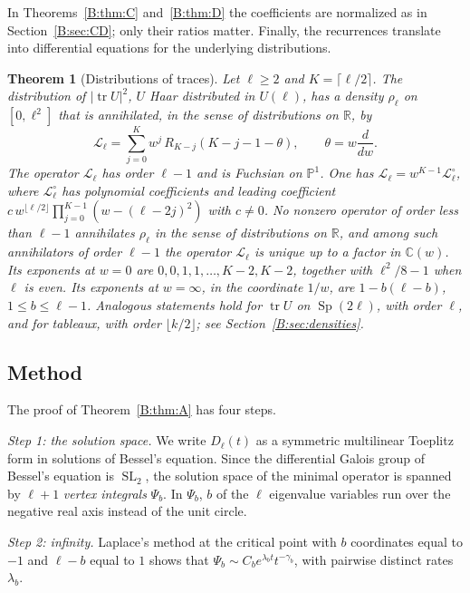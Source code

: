 \documentclass[11pt,a4paper]{article}
\newtheorem{theorem}{Theorem}[section]
\theoremstyle{definition}
\theoremstyle{remark}
\newcommand{\C}{\mathbb C}
\newcommand{\R}{\mathbb R}
\newcommand{\fl}[1]{\lfloor #1\rfloor}
\newcommand{\cl}[1]{\lceil #1\rceil}
\DeclareMathOperator{\SL}{SL}
\DeclareMathOperator{\tr}{tr}
\DeclareMathOperator{\Sp}{Sp}
\numberwithin{equation}{section}
\begin{document}
In Theorems~\ref{B:thm:C} and~\ref{B:thm:D} the coefficients are normalized as in Section~\ref{B:sec:CD}; only their ratios matter. Finally, the recurrences translate into differential equations for the underlying distributions.

\begin{theorem}[Distributions of traces]\label{B:thm:E}
Let $\ell\ge2$ and $K=\cl{\ell/2}$. The distribution of $|\tr U|^2$, $U$ Haar distributed in $U(\ell)$, has a density $\rho_\ell$ on $[0,\ell^2]$ that is annihilated, in the sense of distributions on $\R$, by
\[
\mathcal L_\ell=\sum_{j=0}^{K}w^j\,R_{K-j}(K-j-1-\theta),\qquad \theta=w\frac{d}{dw}.
\]
The operator $\mathcal L_\ell$ has order $\ell-1$ and is Fuchsian on $\mathbb P^1$. One has $\mathcal L_\ell=w^{K-1}\mathcal L^\circ_\ell$, where $\mathcal L^\circ_\ell$ has polynomial coefficients and leading coefficient $c\,w^{\fl{\ell/2}}\prod_{j=0}^{K-1}(w-(\ell-2j)^2)$ with $c\ne0$. No nonzero operator of order less than $\ell-1$ annihilates $\rho_\ell$ in the sense of distributions on $\R$, and among such annihilators of order $\ell-1$ the operator $\mathcal L_\ell$ is unique up to a factor in $\C(w)$. Its exponents at $w=0$ are $0,0,1,1,\dots,K-2,K-2$, together with $\ell^2/8-1$ when $\ell$ is even. Its exponents at $w=\infty$, in the coordinate $1/w$, are $1-b(\ell-b)$, $1\le b\le\ell-1$. Analogous statements hold for $\tr U$ on $\Sp(2\ell)$, with order $\ell$, and for tableaux, with order $\fl{k/2}$; see Section~\ref{B:sec:densities}.
\end{theorem}

\subsection{Method}
The proof of Theorem~\ref{B:thm:A} has four steps.

\emph{Step 1: the solution space.} We write $D_\ell(t)$ as a symmetric multilinear Toeplitz form in solutions of Bessel's equation. Since the differential Galois group of Bessel's equation is $\SL_2$, the solution space of the minimal operator is spanned by $\ell+1$ \emph{vertex integrals} $\Psi_b$. In $\Psi_b$, $b$ of the $\ell$ eigenvalue variables run over the negative real axis instead of the unit circle.

\emph{Step 2: infinity.} Laplace's method at the critical point with $b$ coordinates equal to $-1$ and $\ell-b$ equal to $1$ shows that $\Psi_b\sim C_be^{\lambda_bt}t^{-\gamma_b}$, with pairwise distinct rates $\lambda_b$.
\end{document}
